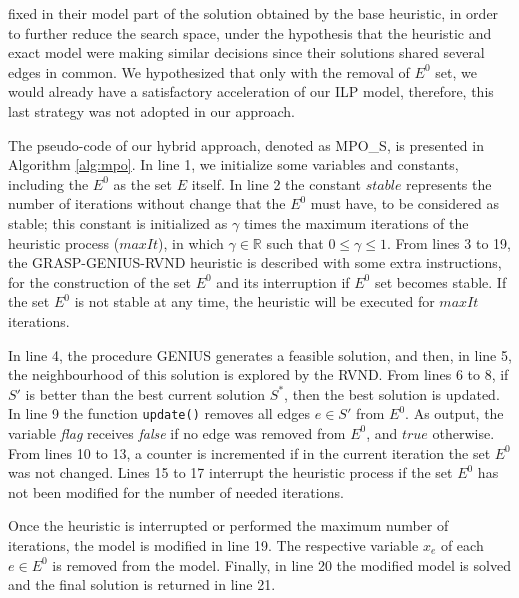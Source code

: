 \documentclass{singlecol-new}
\theoremstyle{TH}{
\newtheorem{lemma}{Lemma}
\newtheorem{theorem}[lemma]{Theorem}
\newtheorem{corrolary}[lemma]{Corrolary}
\newtheorem{conjecture}[lemma]{Conjecture}
\newtheorem{proposition}[lemma]{Proposition}
\newtheorem{claim}[lemma]{Claim}
\newtheorem{stheorem}[lemma]{Wrong Theorem}
}
\theoremstyle{THrm}{
\newtheorem{definition}{Definition}[section]
\newtheorem{question}{Question}[section]
\newtheorem{remark}{Remark}
\newtheorem{scheme}{Scheme}
}
\theoremstyle{THhit}{
\newtheorem{case}{Case}[section]
}
\begin{document}
\citet{climaco2018} fixed in their model part of the solution obtained by the base heuristic, in order to further reduce the search space, under the hypothesis that the heuristic and exact model were making similar decisions since their solutions shared several edges in common. We hypothesized that only with the removal of $E^0$ set, we would already have a satisfactory acceleration of our ILP model, therefore, this last strategy was not adopted in our approach.
                                          
The pseudo-code of our hybrid approach, denoted as MPO\-\_S, is presented in Algorithm \ref{alg:mpo}. In line 1, we initialize some variables and constants, including the $E^0$ as the set $E$ itself. In line 2 the constant $stable$ represents the number of iterations without change that the $E^0$ must have, to be considered as stable; this constant is initialized as $\gamma$ times the maximum iterations of the heuristic process ($maxIt$), in which $\gamma \in \mathbb{R}$ such that $0 \leq \gamma \leq 1$. From lines 3 to 19, the GRASP-GENIUS-RVND heuristic is described with some extra instructions, for the construction of the set $E^0$ and its interruption if $E^0$ set becomes stable. If the set $E^0$ is not stable at any time, the heuristic will be executed for $maxIt$ iterations.
                                          
 In line 4, the procedure GENIUS generates a feasible solution, and then, in line 5, the neighbourhood of this solution is explored by the RVND. From lines 6 to 8, if $S'$ is better than the best current solution $S^*$, then the best solution is updated. In line 9 the function \texttt{update()} removes all edges $e \in S'$ from $E^0$. As output, the variable \textit{flag} receives \textit{false} if no edge was removed from $E^0$, and $true$ otherwise. From lines 10 to 13, a counter is incremented if in the current iteration the set $E^0$ was not changed. Lines 15 to 17 interrupt the heuristic process if the set $E^0$ has not been modified for the number of needed iterations.
                                          
 Once the heuristic is interrupted or performed the maximum number of iterations, the model is modified in line 19. The respective variable $x_e$ of each $e \in E^0$ is removed from the model. Finally, in line 20 the modified model is solved and the final solution is returned in line 21.
                                          
\end{document}
